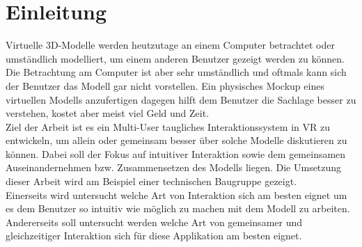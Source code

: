 \chapter{Einleitung}
\label{ch:Einleitung}

Virtuelle 3D-Modelle werden heutzutage an einem Computer betrachtet oder umständlich modelliert, um einem anderen Benutzer gezeigt werden zu können. Die Betrachtung am Computer ist aber sehr umständlich und oftmals kann sich der Benutzer das Modell gar nicht vorstellen. Ein physisches Mockup eines virtuellen Modells anzufertigen dagegen hilft dem Benutzer die Sachlage besser zu verstehen, kostet aber meist viel Geld und Zeit. \\

\noindent Ziel der Arbeit ist es ein Multi-User taugliches Interaktionssystem in VR zu entwickeln, um allein oder gemeinsam besser über solche Modelle diskutieren zu können. Dabei soll der Fokus auf intuitiver Interaktion sowie dem gemeinsamen Auseinandernehmen bzw. Zusammensetzen des Modells liegen. Die Umsetzung dieser Arbeit wird am Beispiel einer technischen Baugruppe gezeigt. \\

\noindent Einerseits wird untersucht welche Art von Interaktion sich am besten eignet um es dem Benutzer so intuitiv wie möglich zu machen mit dem Modell zu arbeiten. Andererseits soll untersucht werden welche Art von gemeinsamer und gleichzeitiger Interaktion sich für diese Applikation am besten eignet.